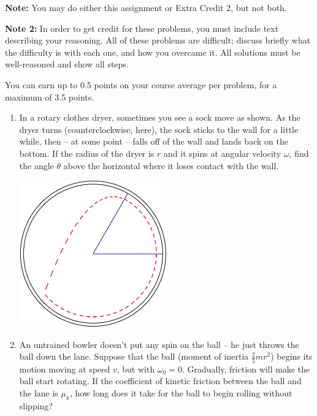 \documentclass[12pt]{article}
\begin{document}
\Large
\centerline{}
\normalsize
\centerline{}

{\bf Note:} You may do either this assignment or Extra Credit 2, but not both.

{\bf Note 2:} In order to get credit for these problems, you must include text describing your reasoning. All of these problems are difficult; discuss briefly what the difficulty is with each one, and 
how you overcame it. All solutions must be well-reasoned and show all steps.

You can earn up to 0.5 points on your course average per problem, for a maximum of 3.5 points.


\begin{enumerate}

\item In a rotary clothes dryer, sometimes you see a sock move as shown. As the dryer turns (counterclockwise, here), the sock sticks to the wall for a little while,
then -- at some point -- falls off of the wall and lands back on the bottom. If the radius of the dryer is $r$ and it spins at angular velocity $\omega$, find the angle
$\theta$ above the horizontal where it loses contact with the wall.

\begin{center}
\includegraphics[width=0.5\textwidth]{sock-crop.pdf}
\end{center}

\item An untrained bowler doesn't put any spin on the ball -- he just throws the ball down the lane. Suppose that the ball (moment of inertia $\frac{2}{5}mr^2$)
begins its motion moving at speed $v$, but with $\omega_0 = 0$. Gradually, friction will make the ball start rotating.
If the coefficient of kinetic friction between the ball and the lane is $\mu_k$, how long does it take
for the ball to begin rolling without slipping?


\end{enumerate}
\end{document}
